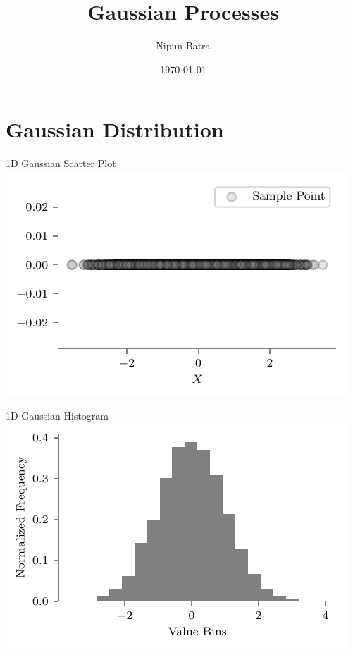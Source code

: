 \documentclass{beamer}
\title{Gaussian Processes}
\date{\today}
\author{Nipun Batra}
\institute{IIT Gandhinagar}
\begin{document}
  \maketitle
  
  
  
\section{Gaussian Distribution}
  \begin{frame}{1D Gaussian Scatter Plot}
    \includegraphics[width=\linewidth,height=\textheight,keepaspectratio]{gp/1d-gp}
  \end{frame}

  \begin{frame}{1D Gaussian Histogram}
\includegraphics[width=\linewidth,height=\textheight,keepaspectratio]{gp/1d-gp-hist}
\end{frame}
\end{document}

